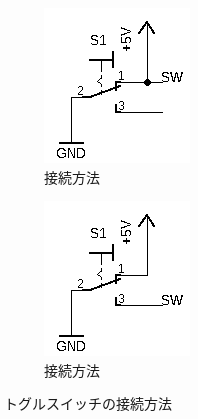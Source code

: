 \documentclass[a4paper,11pt,dvipdfmx]{jsarticle}
\begin{document}
\begin{figure}[htbp]
  \centering
  \begin{subfigure}{0.4\columnwidth}
    \centering
    \includegraphics[width=0.8\columnwidth]{./images/toggle_a.png}
    \caption{接続方法}
    \label{fig:toggle_a}
  \end{subfigure}
  \begin{subfigure}{0.4\columnwidth}
    \centering
    \includegraphics[width=0.8\columnwidth]{./images/toggle_b.png}
    \caption{接続方法}
    \label{fig:toggle_b}
  \end{subfigure}
  \caption{トグルスイッチの接続方法}
\end{figure}
\end{document}

